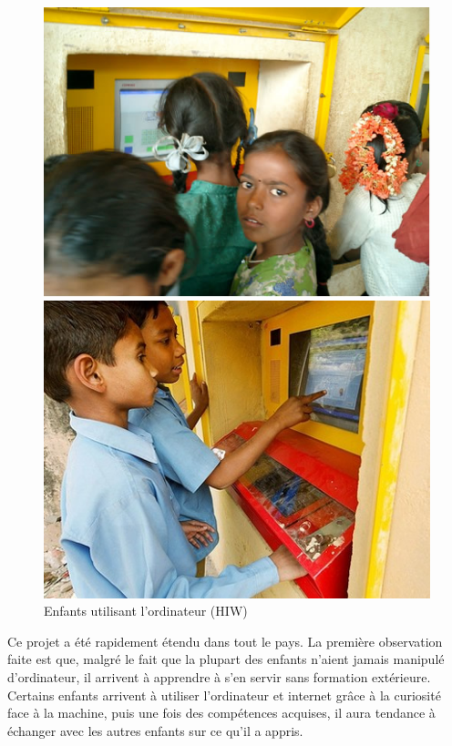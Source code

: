   \begin{figure}[H]
    \centering
\begin{minipage}[H]{.45\linewidth}
    \includegraphics[width=\textwidth]{../resources/illustrations/hiw_2}
\end{minipage}
\begin{minipage}[H]{.45\linewidth}
    \includegraphics[width=\textwidth]{../resources/illustrations/hiw_3}
\end{minipage}
    \caption{Enfants utilisant l'ordinateur (\gls{HIW})}
    \centering
  \end{figure}

Ce projet a été rapidement étendu dans tout le pays. La première observation faite est que, malgré le fait que la plupart des enfants n'aient jamais manipulé d'ordinateur, il arrivent à apprendre à s'en servir sans formation extérieure. Certains enfants arrivent à utiliser l'ordinateur et internet grâce à la curiosité face à la machine, puis une fois des compétences acquises, il aura tendance à échanger avec les autres enfants sur ce qu'il a appris.

